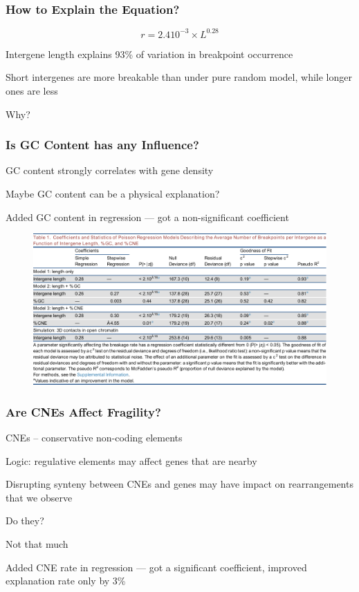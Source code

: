 \documentclass[svgnames,14pt]{beamer}
\begin{document}
\begin{frame}
\frametitle{How to Explain the Equation?}
$$r = 2.4 10^{-3} \times L ^ {0.28}$$

Intergene length explains 93\% of variation in breakpoint occurrence
\vspace{12pt}

Short intergenes are more breakable than under pure random model,
while longer ones are less
\vspace{12pt}

Why?
\end{frame}

\begin{frame}
\frametitle{Is GC Content has any Influence?}
GC content strongly correlates with gene density
\vspace{12pt}

Maybe GC content can be a physical explanation?
\pause

\vspace{12pt}
Added GC content in regression --- got a non-significant coefficient
\end{frame}

\begin{frame}
\begin{figure}
	\centering
	\includegraphics[scale = .67]{Table11.pdf}
\end{figure}
\end{frame}

\begin{frame}
\frametitle{Are CNEs Affect Fragility?}
CNEs -- conservative non-coding elements
\vspace{12pt}

Logic: regulative elements may affect genes that are nearby

\vspace{12pt}
Disrupting synteny between CNEs and genes may have impact on rearrangements that we observe

\vspace{12pt}
Do they?
\vspace{12pt}

\pause
Not that much
\vspace{12pt}

Added CNE rate in regression --- got a significant coefficient, improved explanation rate only by 3\%
\end{frame}
\end{document}
